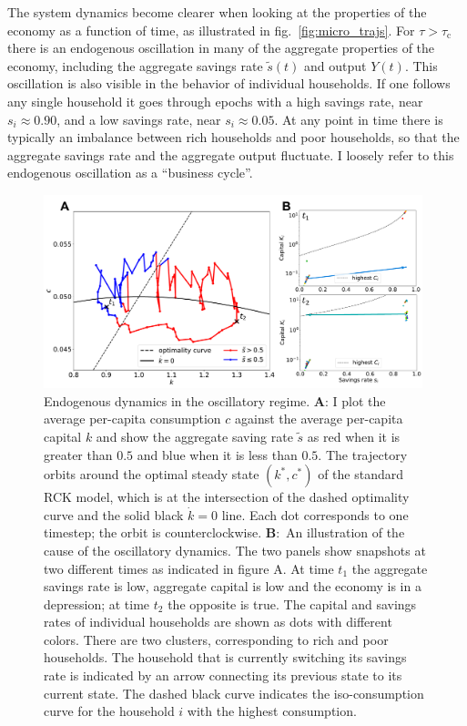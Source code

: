The system dynamics become clearer when looking at the properties of the 
economy as a function of time, as illustrated in fig.~\ref{fig:micro_trajs}.  
For $\tau \! > \! \tau_\mathrm{c}$ there is an endogenous oscillation in many of the aggregate properties of the economy, including the aggregate savings rate $\tilde{s}(t)$ and output $Y(t)$.  This oscillation is also visible in the behavior of individual households.  If one follows any single household it goes through epochs with a high savings rate, near $s_i \! \approx \! 0.90$, and a low savings rate, near $s_i \! \approx \! 0.05$.  At any point in time there is typically an imbalance between rich households and poor households, so that the aggregate savings rate and the aggregate output fluctuate.  I loosely refer to this endogenous oscillation as a ``business cycle''.
\begin{figure}[t]
     \centering
       \includegraphics[width=0.98\textwidth]
       {figures/fig3.pdf}
	\caption{{ Endogenous dynamics in the oscillatory regime. } \textbf{A}:  I plot the average per-capita consumption $c$ against the average per-capita capital $k$ and show the aggregate saving rate $\tilde{s}$ as red when it is greater than $0.5$ and blue when it is less than $0.5$.  The trajectory orbits around the optimal steady state $(k^\ast,c^\ast)$  of the standard RCK model, which is at the intersection of the dashed optimality curve and the solid black $\dot{k}=0$ line. Each dot corresponds to one timestep; the orbit is counterclockwise.
\textbf{B}:~An illustration of the cause of the oscillatory dynamics.  The two panels show snapshots at two different times as indicated in figure A.  At time $t_1$ the aggregate savings rate is low, aggregate capital is low and the economy is in a depression; at time $t_2$ the opposite is true.  The capital and savings rates of individual households are shown as dots with different colors.  There are two clusters, corresponding to rich and poor households.  The household that is currently switching its savings rate is indicated by an arrow connecting its previous state to its current state.  The dashed black curve indicates the iso-consumption curve for the household $i$ with the highest consumption. }
\label{fig:dynamics}
\end{figure} 


